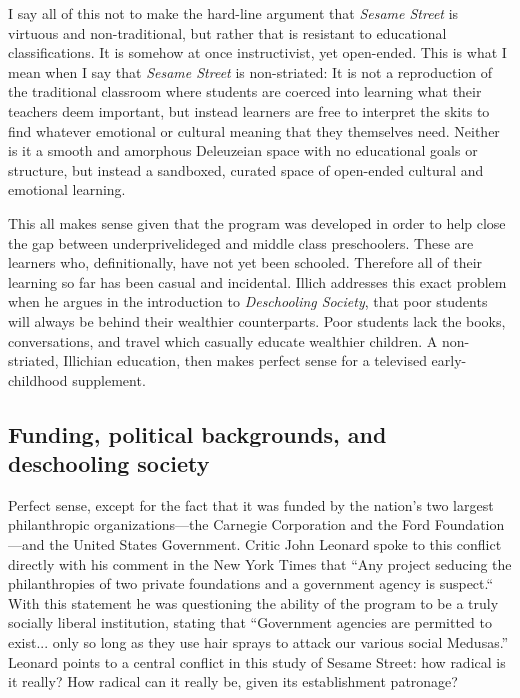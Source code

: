 \documentclass[12pt,letterpaper]{article}
\begin{document}
	I say all of this not to make the hard-line argument that \textit{Sesame
	Street} is virtuous and non-traditional, but rather that is  
	resistant to educational classifications.
	It is somehow at once instructivist, yet open-ended. This
	is what I mean when I say that \textit{Sesame Street} is non-striated: 
	It is not a reproduction of the traditional classroom where students are
	coerced into learning what their teachers deem important, but instead 
	learners are free to interpret the skits to find whatever emotional or 
	cultural meaning that they themselves need. Neither is it a smooth 
	and amorphous Deleuzeian space with no educational goals or structure, 
	but 
	instead a sandboxed, curated space of open-ended cultural and 
	emotional learning.

	This all makes sense given that the program was developed in order to 
	help close the gap between underprivelideged and middle class 
	preschoolers\autocite[sec. 1]{Cooney}. These are learners who, 
	definitionally, have not yet been schooled. Therefore all of their 
	learning so far has been casual and incidental. Illich addresses this 
	exact problem when he argues in the introduction to \textit{Deschooling
	Society}, that poor students will always be behind their wealthier
	counterparts\autocite[5]{Illich}. Poor students lack the books, 
	conversations, and travel which casually educate wealthier children.
	A non-striated, Illichian education, then makes perfect sense for
	a televised early-childhood supplement.

	\subsection*{Funding, political backgrounds, and deschooling society}

	Perfect sense, except for the fact that it was funded by the nation’s 
	two largest philanthropic organizations—the Carnegie Corporation and 
	the Ford Foundation—and the United States Government. Critic John 
	Leonard spoke to this conflict directly with his comment in the New 
	York Times that ``Any project seducing the philanthropies of two private
	foundations and a government agency is suspect.``
	With this statement he was questioning the ability of the program to be
	a truly socially liberal institution, stating that ``Government agencies
	are permitted to exist... only so long as they use hair sprays to 
	attack our various social Medusas.'' \autocite[146]{Davis} Leonard 
	points to a central conflict in this study of Sesame Street: how radical
	is it really? How radical can it really be, given its establishment 
	patronage?
\end{document}
